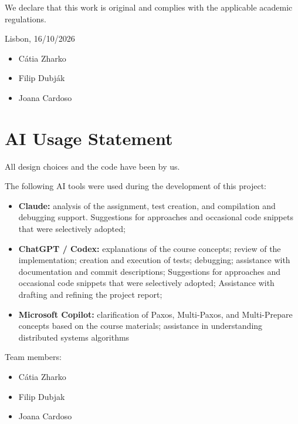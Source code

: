 \documentclass[times,10pt,twocolumn]{article}
\begin{document}
We declare that this work is original and complies with the applicable academic regulations.

Lisbon, 16/10/2026

\begin{itemize}\itemsep 0pt
\item Cátia Zharko
\item Filip Dubják
\item Joana Cardoso
\end{itemize}
\section*{AI Usage Statement}

All design choices and the code have been by us.

The following AI tools were used during the development of this project:

\begin{itemize}\itemsep 0pt
\item \textbf{Claude:} analysis of the assignment, test creation, and compilation and debugging support. Suggestions for approaches and occasional code snippets that were selectively adopted;
\item \textbf{ChatGPT / Codex:} explanations of the course concepts; review of the implementation; creation and execution of tests; debugging; assistance with documentation and commit descriptions; Suggestions for approaches and occasional code snippets that were selectively adopted; Assistance with drafting and refining the project report;
\item \textbf{Microsoft Copilot:} clarification of Paxos, Multi-Paxos, and Multi-Prepare concepts based on the course materials; assistance in understanding distributed systems algorithms
\end{itemize}


Team members:

\begin{itemize}\itemsep 0pt
\item Cátia Zharko
\item Filip Dubjak
\item Joana Cardoso
\end{itemize}
\end{document}
